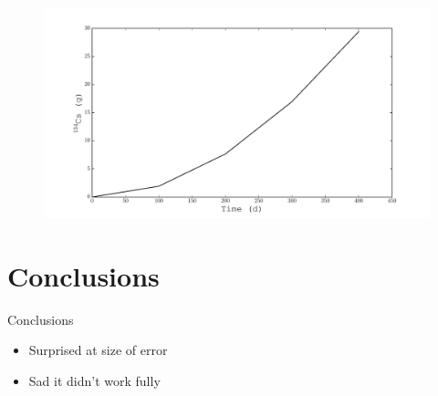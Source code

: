 \documentclass{beamer}
\begin{document}
\begin{frame}
    \begin{figure}[H]
    \begin{center}
      \includegraphics[width=0.77\columnwidth]{../Origen2/PLOTS/CS134Post_XY.pdf}
      \vspace{-5mm}
      \label{fig:POSTXYCs134}
    \end{center}
  \end{figure}
\end{frame}


\section{Conclusions}
\begin{frame}{Conclusions}
  \begin{itemize}
  \item{Surprised at size of error}
  \item{Sad it didn't work fully}
  \end{itemize}
\end{frame}
\end{document}

